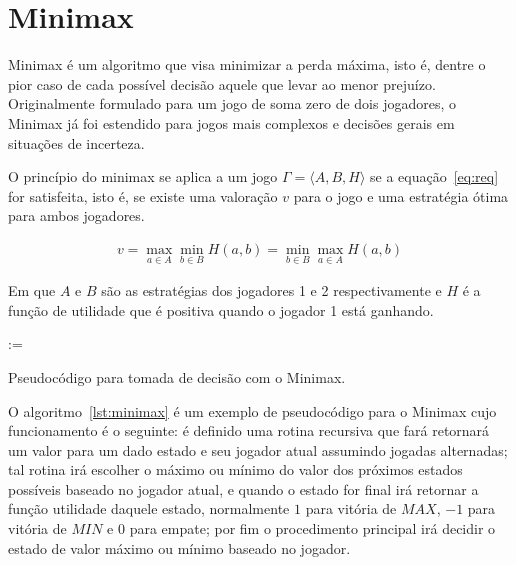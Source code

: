 \chapter{Minimax}\label{cap:minimax}

Minimax é um algoritmo que visa minimizar a perda máxima, isto é, dentre
o pior caso de cada possível decisão aquele que levar ao menor prejuízo.
Originalmente formulado para um jogo de soma zero de dois jogadores, o Minimax
já foi estendido para jogos mais complexos e decisões gerais em situações de
incerteza.

O princípio do minimax se aplica a um jogo $\Gamma=\langle A,B,H\rangle$ se a
equação~\ref{eq:req} for satisfeita, isto é, se existe uma valoração $v$ para o
jogo e uma estratégia ótima para ambos jogadores.
\cite{hazewinkel2002encyclopaedia}

\begin{gather}
  v=\max_{a\in A}\min_{b\in B}H(a,b)=\min_{b\in B}\max_{a\in A}H(a,b)\label{eq:req}
\end{gather}

Em que $A$ e $B$ são as estratégias dos jogadores 1 e 2 respectivamente e $H$ é a
função de utilidade que é positiva quando o jogador 1 está ganhando.

\begin{algorithm}


   := 

  \;

  \caption{Pseudocódigo para tomada de decisão com o Minimax.}\label{lst:minimax}
\end{algorithm}

O algoritmo~\ref{lst:minimax} é um exemplo de pseudocódigo para o Minimax cujo
funcionamento é o seguinte: é definido uma rotina recursiva que fará retornará
um valor para um dado estado e seu jogador atual assumindo jogadas alternadas;
tal rotina irá escolher o máximo ou mínimo do valor dos próximos estados
possíveis baseado no jogador atual, e quando o estado for final irá retornar a
função utilidade daquele estado, normalmente $1$ para vitória de $MAX$, $-1$
para vitória de $MIN$ e $0$ para empate; por fim o procedimento principal irá
decidir o estado de valor máximo ou mínimo baseado no jogador.

